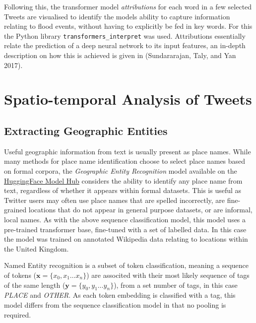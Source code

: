 \documentclass[a4paper, notitlepage]{extreport}
\begin{document}
Following this, the transformer model \emph{attributions} for each word
in a few selected Tweets are visualised to identify the models ability
to capture information relating to flood events, without having to
explicitly be fed in key words. For this the Python library
\texttt{transformers\_interpret} was used. Attributions essentially
relate the prediction of a deep neural network to its input features, an
in-depth description on how this is achieved is given in (Sundararajan,
Taly, and Yan 2017).

\hypertarget{spatio-temporal-analysis-of-tweets}{%
\section{Spatio-temporal Analysis of
Tweets}\label{spatio-temporal-analysis-of-tweets}}

\hypertarget{extracting-geographic-entities}{%
\subsection{Extracting Geographic
Entities}\label{extracting-geographic-entities}}

Useful geographic information from text is usually present as place
names. While many methods for place name identification choose to select
place names based on formal corpora, the \emph{Geographic Entity
Recognition} model available on the
\href{https://huggingface.co/cjber/geographic-entity-recognition}{HuggingFace
Model Hub} considers the ability to identify any place name from text,
regardless of whether it appears within formal datasets. This is useful
as Twitter users may often use place names that are spelled incorrectly,
are fine-grained locations that do not appear in general purpose
datasets, or are informal, local names. As with the above sequence
classification model, this model uses a pre-trained transformer base,
fine-tuned with a set of labelled data. In this case the model was
trained on annotated Wikipedia data relating to locations within the
United Kingdom.

Named Entity recognition is a subset of token classification, meaning a
sequence of tokens (\(\mathbf{x} = \{x_{0}, x_{1}\dots x_{n}\}\)) are
associted with their most likely sequence of tags of the same length
(\(\mathbf{y} = \{y_{0}, y_{1}\dots y_{n}\}\)), from a set number of
tags, in this case \emph{PLACE} and \emph{OTHER}. As each token
embedding is classified with a tag, this model differs from the sequence
classification model in that no pooling is required.
\end{document}
